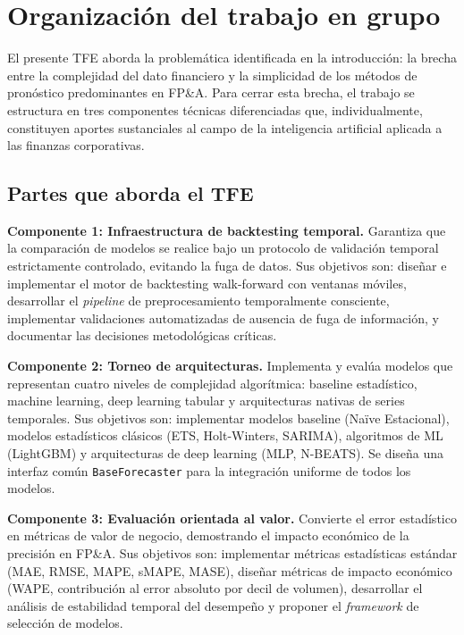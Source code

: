 \chapter*{Organización del trabajo en grupo}
\thispagestyle{fancy}

El presente TFE aborda la problemática identificada en la introducción: la brecha entre la complejidad del dato financiero y la simplicidad de los métodos de pronóstico predominantes en FP\&A. Para cerrar esta brecha, el trabajo se estructura en tres componentes técnicas diferenciadas que, individualmente, constituyen aportes sustanciales al campo de la inteligencia artificial aplicada a las finanzas corporativas.

\section*{Partes que aborda el TFE}

\textbf{Componente 1: Infraestructura de backtesting temporal.} Garantiza que la comparación de modelos se realice bajo un protocolo de validación temporal estrictamente controlado, evitando la fuga de datos. Sus objetivos son: diseñar e implementar el motor de backtesting walk-forward con ventanas móviles, desarrollar el \textit{pipeline} de preprocesamiento temporalmente consciente, implementar validaciones automatizadas de ausencia de fuga de información, y documentar las decisiones metodológicas críticas.

\textbf{Componente 2: Torneo de arquitecturas.} Implementa y evalúa modelos que representan cuatro niveles de complejidad algorítmica: baseline estadístico, machine learning, deep learning tabular y arquitecturas nativas de series temporales. Sus objetivos son: implementar modelos baseline (Naïve Estacional), modelos estadísticos clásicos (ETS, Holt-Winters, SARIMA), algoritmos de ML (LightGBM) y arquitecturas de deep learning (MLP, N-BEATS). Se diseña una interfaz común \texttt{BaseForecaster} para la integración uniforme de todos los modelos.

\textbf{Componente 3: Evaluación orientada al valor.} Convierte el error estadístico en métricas de valor de negocio, demostrando el impacto económico de la precisión en FP\&A. Sus objetivos son: implementar métricas estadísticas estándar (MAE, RMSE, MAPE, sMAPE, MASE), diseñar métricas de impacto económico (WAPE, contribución al error absoluto por decil de volumen), desarrollar el análisis de estabilidad temporal del desempeño y proponer el \textit{framework} de selección de modelos.

